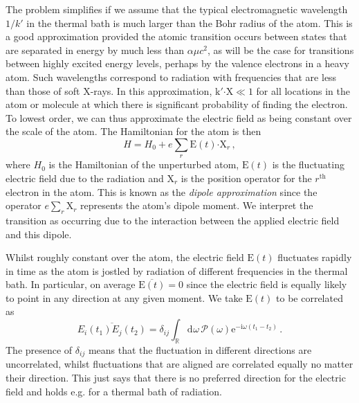 \documentclass{article}
\theoremstyle{plain}\theoremheaderfont{\normalfont\itshape}\theorembodyfont{\rmfamily}\theoremseparator{.}\newtheorem*{rem}{Remark}\newtheorem*{ex}{Example}\newtheorem*{proof}{Proof}\newtheorem*{altp}{Alternative proof}
\theoremstyle{plain}\theoremheaderfont{\normalfont\bfseries}\theorembodyfont{\rmfamily}\theoremseparator{.}\newtheorem{thm}{Theorem}[section]\newtheorem{lem}[thm]{Lemma}\newtheorem{prop}[thm]{Proposition}\newtheorem*{cor}{Corollary}\newtheorem{defn}[thm]{Definition}\newtheorem{clm}[thm]{Claim}\newtheorem{clminproof}{Claim}
\theoremstyle{break}\theoremheaderfont{\normalfont\itshape}\theorembodyfont{\rmfamily}\theoremseparator{.\medskip}\newtheorem*{proofskip}{Proof}\newtheorem*{exs}{Examples}\newtheorem*{rems}{Remarks}
\theoremstyle{break}\theoremheaderfont{\normalfont\bfseries}\theorembodyfont{\rmfamily}\theoremseparator{.\medskip}\newtheorem{lemskip}[thm]{Lemma}\newtheorem{defnskip}[thm]{Definition}\newtheorem{propskip}[thm]{Proposition}\newtheorem{thmskip}[thm]{Theorem}
\numberwithin{equation}{section}
\newcommand{\ii}{\mathrm{i}}
\newcommand{\ee}{\mathrm{e}}
\newcommand{\dd}[2][]{\mathrm{d}^{#1} #2\,}
\newcommand{\vb}[1]{\bm{\mathrm{#1}}}
\newcommand{\vdot}{\bm{\cdot}}
\newcommand{\RR}{\mathbb{R}}
\begin{document}
    The problem simplifies if we assume that the typical electromagnetic wavelength \(1/k'\) in the thermal bath is much larger than the Bohr radius of the atom. This is a good approximation provided the atomic transition occurs between states that are separated in energy by much less than \(\alpha\mu c^2\), as will be the case for transitions between highly excited energy levels, perhaps by the valence electrons in a heavy atom. Such wavelengths correspond to radiation with frequencies that are less than those of soft X-rays. In this approximation, \(\vb{k}'\vdot\vb{X}\ll 1\) for all locations in the atom or molecule at which there is significant probability of finding the electron. To lowest order, we can thus approximate the electric field as being constant over the scale of the atom. The Hamiltonian for the atom is then
    \begin{equation}
        H=H_0+e\sum_r \vb{E}(t)\vdot\vb{X}_r\,,
    \end{equation}
    where \(H_0\) is the Hamiltonian of the unperturbed atom, \(\vb{E}(t)\) is the fluctuating electric field due to the radiation and \(\vb{X}_r\) is the position operator for the \(r^{\text{th}}\) electron in the atom. This is known as the \textit{dipole approximation} since the operator \(e\sum_r \vb{X}_r\) represents the atom's dipole moment. We interpret the transition as occurring due to the interaction between the applied electric field and this dipole.

    Whilst roughly constant over the atom, the electric field \(\vb{E}(t)\) fluctuates rapidly in time as the atom is jostled by radiation of different frequencies in the thermal bath. In particular, on average \(\overline{\vb{E}(t)}=0\) since the electric field is equally likely to point in any direction at any given moment. We take \(\vb{E}(t)\) to be correlated as
    \begin{equation}\label{E_field_correlation}
        \overline{E_i(t_1)E_j(t_2)}=\delta_{ij}\int_{\RR}\dd{\omega}\mathcal{P}(\omega)\ee^{-\ii \omega(t_1-t_2)}\,.
    \end{equation}
    The presence of \(\delta_{ij}\) means that the fluctuation in different directions are uncorrelated, whilst fluctuations that are aligned are correlated equally no matter their direction. This just says that there is no preferred direction for the electric field and holds e.g. for a thermal bath of radiation.
\end{document}
